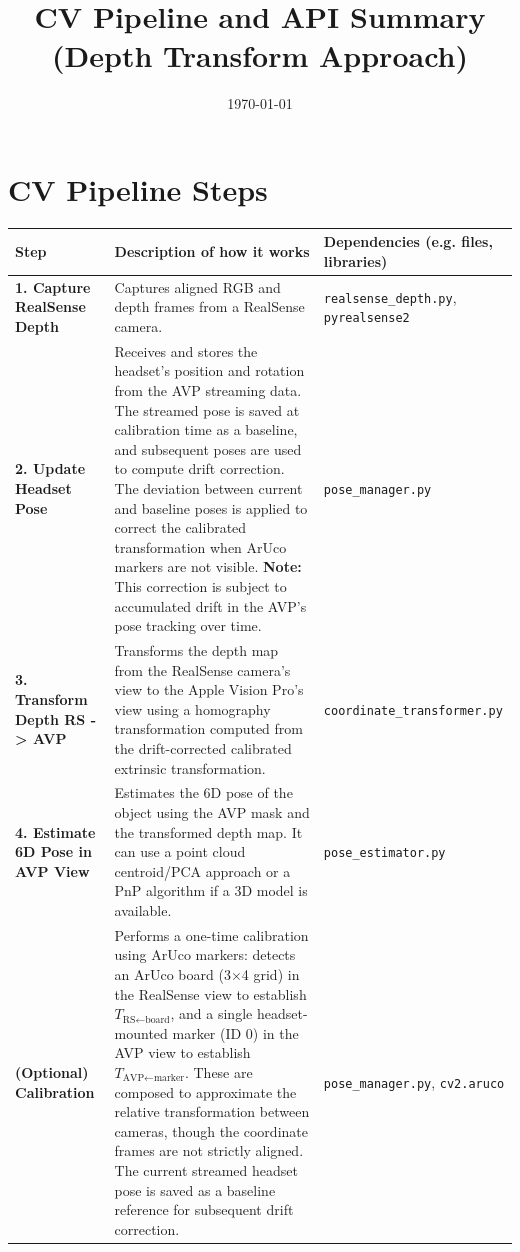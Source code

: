 \documentclass{article}
\title{CV Pipeline and API Summary (Depth Transform Approach)}
\author{}
\date{\today}
\begin{document}
\maketitle

\section*{CV Pipeline Steps}

\begin{longtable}{| >{\raggedright\arraybackslash}p{} | >{\raggedright\arraybackslash}p{} | >{\raggedright\arraybackslash}p{} |}
\hline
\textbf{Step} & \textbf{Description of how it works} & \textbf{Dependencies (e.g. files, libraries)} \\
\hline
\endhead

\textbf{1. Capture RealSense Depth} & Captures aligned RGB and depth frames from a RealSense camera. & \texttt{realsense\_depth.py}, \texttt{pyrealsense2} \\
\hline
\textbf{2. Update Headset Pose} & Receives and stores the headset's position and rotation from the AVP streaming data. The streamed pose is saved at calibration time as a baseline, and subsequent poses are used to compute drift correction. The deviation between current and baseline poses is applied to correct the calibrated transformation when ArUco markers are not visible. \textbf{Note:} This correction is subject to accumulated drift in the AVP's pose tracking over time. & \texttt{pose\_manager.py} \\
\hline
\textbf{3. Transform Depth RS -> AVP} & Transforms the depth map from the RealSense camera's view to the Apple Vision Pro's view using a homography transformation computed from the drift-corrected calibrated extrinsic transformation. & \texttt{coordinate\_transformer.py} \\
\hline
\textbf{4. Estimate 6D Pose in AVP View} & Estimates the 6D pose of the object using the AVP mask and the transformed depth map. It can use a point cloud centroid/PCA approach or a PnP algorithm if a 3D model is available. & \texttt{pose\_estimator.py} \\
\hline
\textbf{(Optional) Calibration} & Performs a one-time calibration using ArUco markers: detects an ArUco board (3$\times$4 grid) in the RealSense view to establish $T_{\text{RS} \leftarrow \text{board}}$, and a single headset-mounted marker (ID 0) in the AVP view to establish $T_{\text{AVP} \leftarrow \text{marker}}$. These are composed to approximate the relative transformation between cameras, though the coordinate frames are not strictly aligned. The current streamed headset pose is saved as a baseline reference for subsequent drift correction. & \texttt{pose\_manager.py}, \texttt{cv2.aruco} \\
\hline
\end{longtable}
\end{document}
